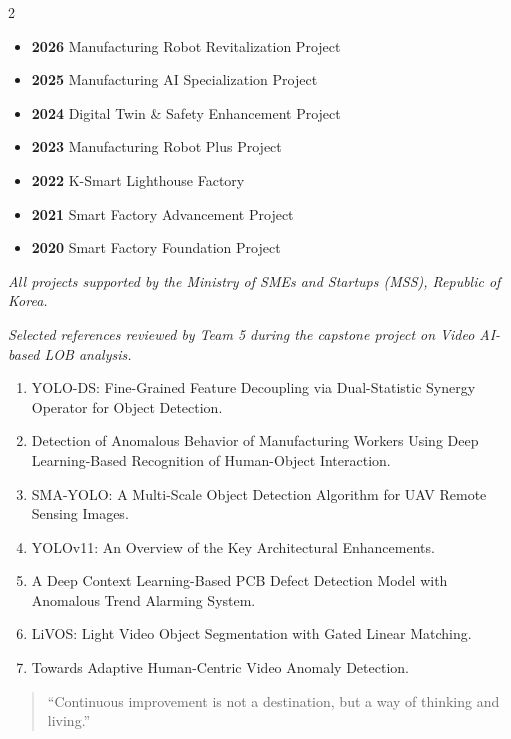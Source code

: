 \documentclass[10pt,a4paper,withhyper]{altacv}
\begin{document}
\begin{paracol}{2}

\begin{itemize}
  \item \textbf{2026} \quad Manufacturing Robot Revitalization Project
  \item \textbf{2025} \quad Manufacturing AI Specialization Project
  \item \textbf{2024} \quad Digital Twin \& Safety Enhancement Project
  \item \textbf{2023} \quad Manufacturing Robot Plus Project
  \item \textbf{2022} \quad K-Smart Lighthouse Factory
  \item \textbf{2021} \quad Smart Factory Advancement Project
  \item \textbf{2020} \quad Smart Factory Foundation Project
\end{itemize}
{\small\color{body}\textit{All projects supported by the Ministry of SMEs and Startups (MSS), Republic of Korea.}}


{\small\color{body}\textit{Selected references reviewed by Team 5 during the capstone project on Video AI-based LOB analysis.}}

\begin{enumerate}\small
  \item YOLO-DS: Fine-Grained Feature Decoupling via Dual-Statistic Synergy Operator for Object Detection.
  \item Detection of Anomalous Behavior of Manufacturing Workers Using Deep Learning-Based Recognition of Human-Object Interaction.
  \item SMA-YOLO: A Multi-Scale Object Detection Algorithm for UAV Remote Sensing Images.
  \item YOLOv11: An Overview of the Key Architectural Enhancements.
  \item A Deep Context Learning-Based PCB Defect Detection Model with Anomalous Trend Alarming System.
  \item LiVOS: Light Video Object Segmentation with Gated Linear Matching.
  \item Towards Adaptive Human-Centric Video Anomaly Detection.
\end{enumerate}

\switchcolumn



\begin{quote}
``Continuous improvement is not a destination, but a way of thinking and living.''
\end{quote}


\end{paracol}
\end{document}
